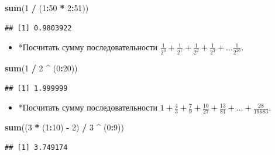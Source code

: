 \documentclass[]{book}
\newenvironment{Shaded}{\begin{snugshade}}{\end{snugshade}}
\newcommand{\KeywordTok}[1]{\textcolor[rgb]{0.13,0.29,0.53}{\textbf{#1}}}
\newcommand{\DecValTok}[1]{\textcolor[rgb]{0.00,0.00,0.81}{#1}}
\newcommand{\StringTok}[1]{\textcolor[rgb]{0.31,0.60,0.02}{#1}}
\newcommand{\OperatorTok}[1]{\textcolor[rgb]{0.81,0.36,0.00}{\textbf{#1}}}
\newcommand{\NormalTok}[1]{#1}
\providecommand{\tightlist}{%
  \setlength{\itemsep}{0pt}\setlength{\parskip}{0pt}}
\begin{document}
\begin{Shaded}
\begin{Highlighting}[]
\KeywordTok{sum}\NormalTok{(}\DecValTok{1} \OperatorTok{/}\StringTok{ }\NormalTok{(}\DecValTok{1}\OperatorTok{:}\DecValTok{50} \OperatorTok{*}\StringTok{ }\DecValTok{2}\OperatorTok{:}\DecValTok{51}\NormalTok{))}
\end{Highlighting}
\end{Shaded}

\begin{verbatim}
## [1] 0.9803922
\end{verbatim}

\begin{itemize}
\tightlist
\item
  *Посчитать сумму последовательности
  \(\frac{1}{2^{0}}+\frac{1}{2^{1}}+\frac{1}{2^{2}}+\frac{1}{2^{3}}+\ldots \frac{1}{2^{20}}\).
\end{itemize}

\begin{Shaded}
\begin{Highlighting}[]
\KeywordTok{sum}\NormalTok{(}\DecValTok{1} \OperatorTok{/}\StringTok{ }\DecValTok{2} \OperatorTok{^}\StringTok{ }\NormalTok{(}\DecValTok{0}\OperatorTok{:}\DecValTok{20}\NormalTok{))}
\end{Highlighting}
\end{Shaded}

\begin{verbatim}
## [1] 1.999999
\end{verbatim}

\begin{itemize}
\tightlist
\item
  *Посчитать сумму последовательности
  \(1+\frac{4}{3}+\frac{7}{9}+\frac{10}{27}+\frac{13}{81}+\ldots+\frac{28}{19683}\).
\end{itemize}

\begin{Shaded}
\begin{Highlighting}[]
\KeywordTok{sum}\NormalTok{((}\DecValTok{3} \OperatorTok{*}\StringTok{ }\NormalTok{(}\DecValTok{1}\OperatorTok{:}\DecValTok{10}\NormalTok{) }\OperatorTok{-}\StringTok{ }\DecValTok{2}\NormalTok{) }\OperatorTok{/}\StringTok{ }\DecValTok{3} \OperatorTok{^}\StringTok{ }\NormalTok{(}\DecValTok{0}\OperatorTok{:}\DecValTok{9}\NormalTok{))}
\end{Highlighting}
\end{Shaded}

\begin{verbatim}
## [1] 3.749174
\end{verbatim}
\end{document}
